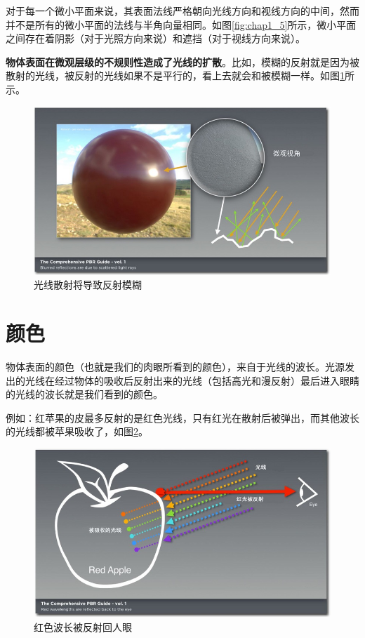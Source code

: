 对于每一个微小平面来说，其表面法线严格朝向光线方向和视线方向的中间，然而并不是所有的微小平面的法线与半角向量相同。如图\ref{fig:chap1_5}所示，微小平面之间存在着阴影（对于光照方向来说）和遮挡（对于视线方向来说）。

\textbf{物体表面在微观层级的不规则性造成了光线的扩散}。比如，模糊的反射就是因为被散射的光线，被反射的光线如果不是平行的，看上去就会和被模糊一样。如图\ref{fig:chap1_6}所示。

\begin{figure}[ht]
    \centering
	\includegraphics[width=\textwidth]{images/chap1_6.jpg}
	\caption{光线散射将导致反射模糊}
    \label{fig:chap1_6}
\end{figure}

\section{颜色}

物体表面的颜色（也就是我们的肉眼所看到的颜色），来自于光线的波长。光源发出的光线在经过物体的吸收后反射出来的光线（包括高光和漫反射）最后进入眼睛的光线的波长就是我们看到的颜色。

例如：红苹果的皮最多反射的是红色光线，只有红光在散射后被弹出，而其他波长的光线都被苹果吸收了，如图\ref{fig:chap1_7}。

\begin{figure}[ht]
    \centering
	\includegraphics[width=\textwidth]{images/chap1_7.jpg}
	\caption{红色波长被反射回人眼}
    \label{fig:chap1_7}
\end{figure}

